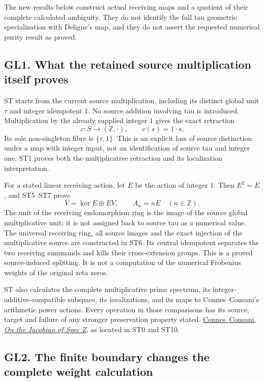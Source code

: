 The new results below construct actual receiving maps and a quotient of
their complete calculated ambiguity. They do not identify the full tau
geometric specialization with Deligne's map, and they do not assert the
requested numerical purity result as proved.

\subsection{GL1. What the retained source multiplication itself
proves}\label{gl1.-what-the-retained-source-multiplication-itself-proves}

ST starts from the current source multiplication, including its distinct
global unit \(\tau\) and integer idempotent \(1\). No source addition
involving tau is introduced. Multiplication by the already supplied
integer \(1\) gives the exact retraction \[
c:S\longrightarrow(\mathbb Z,\cdot),\qquad c(s)=1\cdot s.
\] Its sole non-singleton fibre is \(\{\tau,1\}\). This is an explicit
loss of source distinction under a map with integer input, not an
identification of source tau and integer one. ST1 proves both the
multiplicative retraction and its localization interpretation.

For a stated linear receiving action, let \(E\) be the action of integer
\(1\). Then \(E^2=E\), and ST5--ST7 prove \[
V=\ker E\oplus EV,\qquad A_n=nE\quad(n\in\mathbb Z).
\] The unit of the receiving endomorphism ring is the image of the
source global multiplicative unit; it is not assigned back to source tau
as a numerical value. The universal receiving ring, all source images
and the exact injection of the multiplicative source are constructed in
ST6. Its central idempotent separates the two receiving summands and
kills their cross-extension groups. This is a proved source-induced
splitting. It is not a computation of the numerical Frobenius weights of
the original zeta zeros.

ST also calculates the complete multiplicative prime spectrum, its
integer-additive-compatible subspace, its localizations, and its maps to
Connes--Consani's arithmetic power actions. Every operation in those
comparisons has its source, target and failure of any stronger
preservation property stated.
\href{https://arxiv.org/abs/2602.15941v1}{Connes--Consani, \emph{On the
Jacobian of Spec Z}}, as located in ST0 and ST10.

\subsection{GL2. The finite boundary changes the complete weight
calculation}\label{gl2.-the-finite-boundary-changes-the-complete-weight-calculation}

